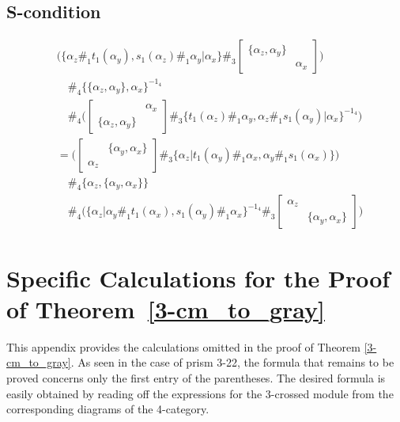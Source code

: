 \documentclass[11pt, reqno]{amsart} %
\theoremstyle{definition}
\theoremstyle{remark}
\numberwithin{equation}{section}
\begin{document}
\noindent
\subsection{S-condition}
\begin{align}
  \nonumber
  &
  \bigl(
    \{\alpha_z\#_1t_1(\alpha_y),s_1(\alpha_z)\#_1\alpha_y|\alpha_x\}
    \#_3
    \begin{bmatrix}\{\alpha_z,\alpha_y\} & \\ & \alpha_x\end{bmatrix}
  \bigr) \\
  \nonumber
  &\quad \#_4
  \{\{\alpha_z,\alpha_y\},\alpha_x\}^{-1_4} \\
  \nonumber
  &\quad \#_4
  \bigl(
    \begin{bmatrix}& \alpha_x \\ \{\alpha_z,\alpha_y\} &\end{bmatrix}
    \#_3
    \{t_1(\alpha_z)\#_1\alpha_y,\alpha_z\#_1s_1(\alpha_y)|\alpha_x\}^{-1_4}
  \bigr) \\
  \nonumber
  &= 
  \bigl(
    \begin{bmatrix}& \{\alpha_y,\alpha_x\} \\ \alpha_z &\end{bmatrix}
    \#_3
    \{\alpha_z|t_1(\alpha_y)\#_1\alpha_x,\alpha_y\#_1s_1(\alpha_x)\}
  \bigr) \\
  \nonumber
  &\quad \#_4
  \{\alpha_z,\{\alpha_y,\alpha_x\}\} \\
  \label{eq:SpSm}
  &\quad \#_4
  \bigl(
    \{\alpha_z|\alpha_y\#_1t_1(\alpha_x),s_1(\alpha_y)\#_1\alpha_x\}^{-1_4}
    \#_3
    \begin{bmatrix}\alpha_z & \\ & \{\alpha_y,\alpha_x\}\end{bmatrix}
  \bigr)
\end{align}



\section{Specific Calculations for the Proof of Theorem~\ref{3-cm_to_gray}}
\label{proof:3-cm_to_Gray4-group}
This appendix provides the calculations omitted in the proof of Theorem \ref{3-cm_to_gray}. As seen in the case of prism 3-22, the formula that remains to be proved concerns only the first entry of the parentheses. The desired formula is easily obtained by reading off the expressions for the 3-crossed module from the corresponding diagrams of the 4-category.
\end{document}
